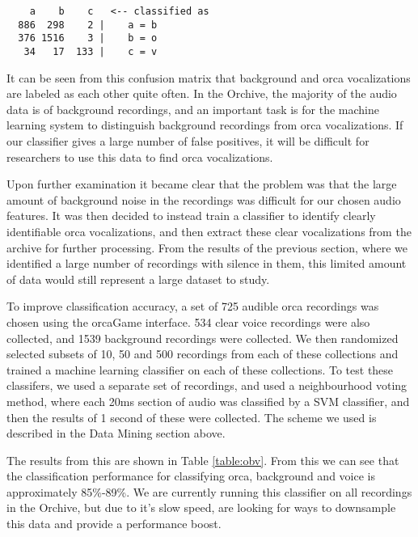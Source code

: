 \begin{verbatim}
    a    b    c   <-- classified as
  886  298    2 |    a = b
  376 1516    3 |    b = o
   34   17  133 |    c = v
\end{verbatim}

It can be seen from this confusion matrix that background and orca
vocalizations are labeled as each other quite often.  In the Orchive,
the majority of the audio data is of background recordings, and an
important task is for the machine learning system to distinguish
background recordings from orca vocalizations.  If our classifier
gives a large number of false positives, it will be difficult for
researchers to use this data to find orca vocalizations.

Upon further examination it became clear that the problem was that the
large amount of background noise in the recordings was difficult for
our chosen audio features.  It was then decided to instead train a
classifier to identify clearly identifiable orca vocalizations, and
then extract these clear vocalizations from the archive for further
processing.  From the results of the previous section, where we
identified a large number of recordings with silence in them, this
limited amount of data would still represent a large dataset to study.

To improve classification accuracy, a set of 725 audible orca recordings
was chosen using the orcaGame interface.  534 clear voice recordings
were also collected, and 1539 background recordings were collected.
We then randomized selected subsets of 10, 50 and 500 recordings from
each of these collections and trained a machine learning classifier on
each of these collections.  To test these classifers, we used a
separate set of recordings, and used a neighbourhood voting method,
where each 20ms section of audio was classified by a SVM classifier,
and then the results of 1 second of these were collected.  The scheme
we used is described in the Data Mining section above.

The results from this are shown in Table \ref{table:obv}.  From this
we can see that the classification performance for classifying orca,
background and voice is approximately 85\%-89\%.  We are currently
running this classifier on all recordings in the Orchive, but due to
it's slow speed, are looking for ways to downsample this data and
provide a performance boost.


